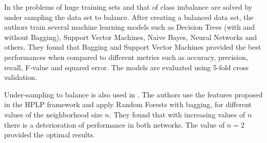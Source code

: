 \documentclass{acm_proc_article-sp}
\begin{document}
In \cite{Hasan06linkprediction} the problems of huge training sets and that of class imbalance are solved by under sampling the data set to balance. After creating a balanced data set, the authors train several machine learning models such as Decision Trees (with and without Bagging), Support Vector Machines, Naive Bayes, Neural Networks and others. They found that Bagging and Support Vector Machines provided the best performances when compared to different metrics such as accuracy, precision, recall, F-value and squared error. The models are evaluated using 5-fold cross validation.

Under-sampling to balance is also used in \cite{Lichtenwalter:2010:NPM:1835804.1835837}. The authors use the features proposed in the HPLP framework and apply Random Forests with bagging, for different values of the neighborhood size $n$. They found that with increasing values of $n$ there is a deterioration of performance in both networks. The value of $n=2$ provided the optimal results.
 


\end{document}
